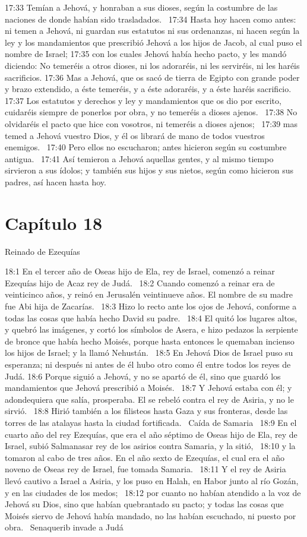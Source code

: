 17:33 Temían a Jehová, y honraban a sus dioses, según la costumbre de las naciones de donde habían sido trasladados.  
17:34 Hasta hoy hacen como antes: ni temen a Jehová, ni guardan sus estatutos ni sus ordenanzas, ni hacen según la ley y los mandamientos que prescribió Jehová a los hijos de Jacob, al cual puso el nombre de Israel; 
17:35 con los cuales Jehová había hecho pacto, y les mandó diciendo: No temeréis a otros dioses, ni los adoraréis, ni les serviréis, ni les haréis sacrificios. 
17:36 Mas a Jehová, que os sacó de tierra de Egipto con grande poder y brazo extendido, a éste temeréis, y a éste adoraréis, y a éste haréis sacrificio.  
17:37 Los estatutos y derechos y ley y mandamientos que os dio por escrito, cuidaréis siempre de ponerlos por obra, y no temeréis a dioses ajenos.  
17:38 No olvidaréis el pacto que hice con vosotros, ni temeréis a dioses ajenos;  
17:39 mas temed a Jehová vuestro Dios, y él os librará de mano de todos vuestros enemigos.  
17:40 Pero ellos no escucharon; antes hicieron según su costumbre antigua.  
17:41 Así temieron a Jehová aquellas gentes, y al mismo tiempo sirvieron a sus ídolos; y también sus hijos y sus nietos, según como hicieron sus padres, así hacen hasta hoy.  
\section*{Capítulo 18 }
Reinado de Ezequías  


18:1 En el tercer año de Oseas hijo de Ela, rey de Israel, comenzó a reinar Ezequías hijo de Acaz rey de Judá.  
18:2 Cuando comenzó a reinar era de veinticinco años, y reinó en Jerusalén veintinueve años. El nombre de su madre fue Abi hija de Zacarías.  
18:3 Hizo lo recto ante los ojos de Jehová, conforme a todas las cosas que había hecho David su padre.  
18:4 El quitó los lugares altos, y quebró las imágenes, y cortó los símbolos de Asera, e hizo pedazos la serpiente de bronce que había hecho Moisés, porque hasta entonces le quemaban incienso los hijos de Israel; y la llamó Nehustán.  
18:5 En Jehová Dios de Israel puso su esperanza; ni después ni antes de él hubo otro como él entre todos los reyes de Judá. 
18:6 Porque siguió a Jehová, y no se apartó de él, sino que guardó los mandamientos que Jehová prescribió a Moisés.  
18:7 Y Jehová estaba con él; y adondequiera que salía, prosperaba. El se rebeló contra el rey de Asiria, y no le sirvió.  
18:8 Hirió también a los filisteos hasta Gaza y sus fronteras, desde las torres de las atalayas hasta la ciudad fortificada.  
Caída de Samaria  
18:9 En el cuarto año del rey Ezequías, que era el año séptimo de Oseas hijo de Ela, rey de Israel, subió Salmanasar rey de los asirios contra Samaria, y la sitió,  
18:10 y la tomaron al cabo de tres años. En el año sexto de Ezequías, el cual era el año noveno de Oseas rey de Israel, fue tomada Samaria.  
18:11 Y el rey de Asiria llevó cautivo a Israel a Asiria, y los puso en Halah, en Habor junto al río Gozán, y en las ciudades de los medos;  
18:12 por cuanto no habían atendido a la voz de Jehová su Dios, sino que habían quebrantado su pacto; y todas las cosas que Moisés siervo de Jehová había mandado, no las habían escuchado, ni puesto por obra.  
Senaquerib invade a Judá  

